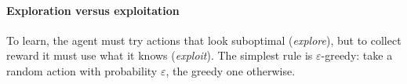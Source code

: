 \paragraph{Exploration versus exploitation} To learn, the agent must try actions that look
suboptimal (\emph{explore}), but to collect reward it must use what it knows
(\emph{exploit}). The simplest rule is $\varepsilon$-greedy: take a random action with
probability $\varepsilon$, the greedy one otherwise.
